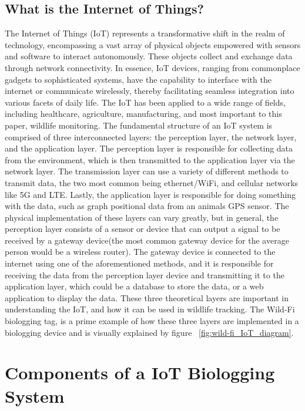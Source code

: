 \documentclass[sigplan,screen,nonacm]{acmart}
\begin{document}
\subsection{What is the Internet of Things?}
\label{subsec:What is the Internet of Things}

The Internet of Things (IoT) represents a transformative shift in the
realm of technology, encompassing a vast array of physical objects empowered
with sensors and software to interact autonomously. These objects collect and
exchange data through network connectivity. In essence, IoT devices, ranging
from commonplace gadgets to sophisticated systems, have the capability to
interface with the internet or communicate wirelessly, thereby facilitating
seamless integration into various facets of daily life. The IoT has been
applied to a wide range of fields, including healthcare, agriculture,
manufacturing, and most important to this paper, wildlife monitoring.
The fundamental structure of an IoT system is comprised of three
interconnected layers: the perception layer, the network layer, and the
application layer\cite{kumar2019internet}. The perception layer is responsible for collecting data
from the environment, which is then transmitted to the application layer via the network layer.
The transmission layer can use a variety of different methods to transmit data, the two most common being
ethernet/WiFi, and cellular networks like 5G and LTE\cite{greengard2021internet}. Lastly, the application
layer is responsible for doing something with the data, such as graph positional data from an
animals GPS sensor. The physical implementation of these layers
can vary greatly, but in general, the perception layer consists of a sensor or device that can
output a signal to be received by a gateway device(the most common gateway device for
the average person would be a wireless router). The gateway device is connected to
the internet using one of the aforementioned methods, and it is responsible for
receiving the data from the perception layer device and transmitting it to the application
layer, which could be a database to store the data, or a web application to display
the data\cite{kumar2019internet}. These three theoretical layers are important in understanding the IoT,
and how it can be used in wildlife tracking. The Wild-Fi biologging tag, is a prime example 
of how these three layers are implemented in a biologging device and is visually explained 
by figure ~\ref{fig:wild-fi_IoT_diagram}.

\section{Components of a IoT Biologging System}
\label{sec:Components of a IoT Biologging Device}
\end{document}
